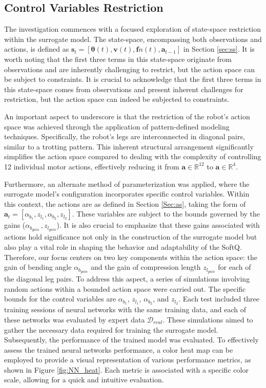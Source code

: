 \subsection{Control Variables Restriction}
The investigation commences with a focused exploration of state-space restriction within the surrogate model. The state-space, encompassing both observations and actions, is defined as $\mathbf{s}_t = [\pmb{\theta}(t), \mathbf{v}(t), \mathbf{f}n(t), \mathbf{a}_{t-1}]$ in Section \ref{sec:ss}. It is worth noting that the first three terms in this state-space originate from observations and are inherently challenging to restrict, but the action space can be subject to constraints.  It is crucial to acknowledge that the first three terms in this state-space comes from observations and present inherent challenges for restriction, but the action space can indeed be subjected to constraints. 

An important aspect to underscore is that the restriction of the robot's action space was achieved through the application of pattern-defined modeling techniques. Specifically, the robot's legs are interconnected in diagonal pairs, similar to a trotting pattern. This inherent structural arrangement significantly simplifies the action space compared to dealing with the complexity of controlling 12 individual motor actions\cite{jiSynthesizingOptimalGait2022}, effectively reducing it from $\mathbf{a}\in\mathbb{R}^{12}$ to $\mathbf{a}\in\mathbb{R}^4$. 

Furthermore, an alternate method of parameterization was applied, where the surrogate model's configuration incorporates specific control variables. Within this context, the actions are as defined in Section \ref{Sec:as}, taking the form of $\mathbf{a}_{t} = [\alpha_{b_1}, z_{l_1},\alpha_{b_2},z_{l_2}]$. These variables are subject to the bounds governed by the gains ($\alpha_{b_{gain}}\, , z_{l_{gain}}$). It is also crucial to emphasize that these gains associated with actions hold significance not only in the construction of the surrogate model but also play a vital role in shaping the behavior and adaptability of the SoftQ. Therefore, our focus centers on two key components within the action space: the gain of bending angle $\alpha_{b_{gain}}$ and the gain of compression length $z_{l_{gain}}$ for each of the diagonal leg pairs. To address this aspect, a series of simulations involving random actions within a bounded action space were carried out. The specific bounds for the control variables are $\alpha_{b_1}$, $z_{l_1}$, $\alpha_{b_2}$, and $z_{l_2}$. Each test included three training sessions of neural networks with the same training data, and each of these networks was evaluated by expert data $\mathcal{D}_{real}$. These simulations aimed to gather the necessary data required for training the surrogate model. Subsequently, the performance of the trained model was evaluated. To effectively assess the trained neural networks performance, a color heat map can be employed to provide a visual representation of various performance metrics, as shown in Figure \ref{fig:NN_heat}. Each metric is associated with a specific color scale, allowing for a quick and intuitive evaluation.

